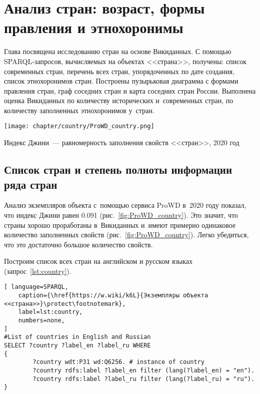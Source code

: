 \chapter{Анализ стран: возраст, формы правления и этнохоронимы}
\label{ch:country}

Глава посвящена исследованию стран на основе Викиданных. 
С помощью SPARQL-запросов, вычисляемых на объектах <<страна>>, получены: 
список современных стран, перечень всех стран, упорядоченных по дате создания, 
список этнохоронимов стран. 
Построены пузырьковая диаграмма с формами правления стран, 
граф соседних стран и карта соседних стран России. 
Выполнена оценка Викиданных по количеству исторических и~современных стран, 
по количеству заполненных этнохоронимов у~стран. 


\begin{marginfigure}[7\baselineskip]
    \texttt{[image: chapter/country/ProWD\_country.png]}
    \caption{Индекс Джини~--- равномерность заполнения свойств <<стран>>, 2020 год}
	\label{fig:ProWD_country}%
\end{marginfigure}


\section{Список стран и степень полноты информации ряда стран}

Анализ экземпляров объекта  
с~помощью сервиса ProWD в~2020 году показал, 
что индекс Джини равен 0.091 (рис.~\ref{fig:ProWD_country}). 
Это значит, что страны хорошо проработаны в~Викиданных 
и~имеют примерно одинаковое количество заполненных свойств (рис.~\ref{fig:ProWD_country}). 
Легко убедиться, что это достаточно большое количество свойств. 

Построим список всех стран на английском и русском языках (запрос~\ref{lst:country}).

\begin{lstlisting}[ language=SPARQL, 
    caption={\href{https://w.wiki/k6L}{Экземпляры объекта <<страна>>}\protect\footnotemark},
    label=lst:country, 
    numbers=none,
]
#List of countries in English and Russian
SELECT ?country ?label_en ?label_ru WHERE
{
		?country wdt:P31 wd:Q6256. # instance of country
		?country rdfs:label ?label_en filter (lang(?label_en) = "en").
		?country rdfs:label ?label_ru filter (lang(?label_ru) = "ru").
}
\end{lstlisting}

